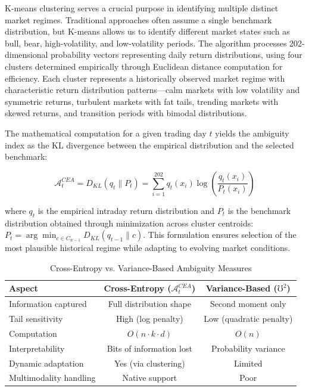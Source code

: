 \documentclass[preprint,12pt,authoryear]{elsarticle}
\begin{document}
K-means clustering serves a crucial purpose in identifying multiple distinct market regimes. Traditional approaches often assume a single benchmark distribution, but K-means allows us to identify different market states such as bull, bear, high-volatility, and low-volatility periods. The algorithm processes 202-dimensional probability vectors representing daily return distributions, using four clusters determined empirically through Euclidean distance computation for efficiency. Each cluster represents a historically observed market regime with characteristic return distribution patterns—calm markets with low volatility and symmetric returns, turbulent markets with fat tails, trending markets with skewed returns, and transition periods with bimodal distributions.

The mathematical computation for a given trading day $t$ yields the ambiguity index as the KL divergence between the empirical distribution and the selected benchmark:

\begin{equation}
\mathcal{A}^{CEA}_t = D_{KL}\left(q_t \parallel P_t\right) = \sum_{i=1}^{202} q_t(x_i) \log\left(\frac{q_t(x_i)}{P_t(x_i)}\right)
\end{equation}

where $q_t$ is the empirical intraday return distribution and $P_t$ is the benchmark distribution obtained through minimization across cluster centroids: $P_t = \arg\min_{c \in C_{w-1}} D_{KL}(q_{t-1} \parallel c)$. This formulation ensures selection of the most plausible historical regime while adapting to evolving market conditions.

\begin{table}[h]
\centering
\caption{Cross-Entropy vs. Variance-Based Ambiguity Measures}
\label{tab:ambiguity_comparison}
\begin{tabularx}{\textwidth}{Xcc}
\toprule
\textbf{Aspect} & \textbf{Cross-Entropy ($\mathcal{A}^{CEA}_t$)} & \textbf{Variance-Based ($\mho^2$)} \\
\midrule
Information captured & Full distribution shape & Second moment only \\
Tail sensitivity & High (log penalty) & Low (quadratic penalty) \\
Computation & $O(n \cdot k \cdot d)$ & $O(n)$ \\
Interpretability & Bits of information lost & Probability variance \\
Dynamic adaptation & Yes (via clustering) & Limited \\
Multimodality handling & Native support & Poor \\
\bottomrule
\end{tabularx}
\end{table}
\end{document}
